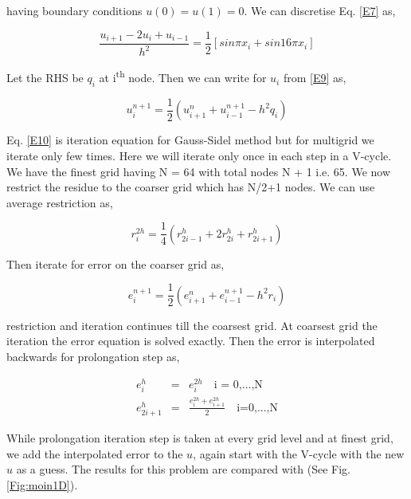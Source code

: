 having boundary conditions $u(0) = u(1) = 0$. We can discretise Eq. \ref{E7} as,

\begin{equation}
 \frac{u_{i+1}-2u_{i}+u_{i-1}}{h^2} = \frac{1}{2}[sin \pi x_i + sin 16 \pi x_i]  
 \label{E9}
\end{equation}

Let the RHS be $q_i$ at i\textsuperscript{th} node. Then we can write for $u_i$ from \ref{E9} as,

\begin{equation}
 u_i^{n+1} = \frac{1}{2}(u_{i+1}^n+u_{i-1}^{n+1}-h^2 q_i)
 \label{E10}
\end{equation}


Eq. \ref{E10} is iteration equation for Gauss-Sidel method but for multigrid we iterate only few times. Here we will iterate only once in 
each step in a V-cycle. We have the finest grid having N = 64 with total nodes N + 1 i.e. 65. We now restrict the residue to the coarser
grid which has N/2+1 nodes. We can use average restriction as, 

\begin{equation}
 r^{2h}_i = \frac{1}{4} (r^h_{2i-1} + 2r^h_{2i} + r^h_{2i+1})
 \label{E11}
\end{equation}

Then iterate for error on the coarser grid as,

\begin{equation}
 e_i^{n+1} = \frac{1}{2}(e_{i+1}^n+e_{i-1}^{n+1}-h^2 r_i)
 \label{E12}
\end{equation}

restriction and iteration continues till the coarsest grid. At coarsest grid the iteration the error equation is solved exactly. Then the 
error is interpolated backwards for prolongation step as,

\begin{equation}
\begin{align}
 e^{h}_i &=& e^{2h}_i \quad \text{i = 0,...,N}\\
  e^{h}_{2i+1} &=& \frac{e^{2h}_i +  e^{2h}_{i+1}}{2} \quad \text{i=0,...,N}
 \end{align}
 \label{E11}
\end{equation}

While prolongation iteration step is taken at every grid level and at finest grid, we add the interpolated error to the $u$, again start with 
the V-cycle with the new $u$ as a guess. The results for this problem are compared with \cite{moin2010fundamentals} (See Fig. \ref{Fig:moin1D}).

